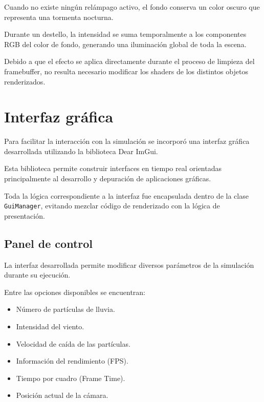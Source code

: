Cuando no existe ningún relámpago activo, el fondo conserva un color oscuro que representa una tormenta nocturna.

Durante un destello, la intensidad se suma temporalmente a los componentes RGB del color de fondo, generando una iluminación global de toda la escena.

Debido a que el efecto se aplica directamente durante el proceso de limpieza del framebuffer, no resulta necesario modificar los shaders de los distintos objetos renderizados.

\section{Interfaz gráfica}

Para facilitar la interacción con la simulación se incorporó una interfaz gráfica desarrollada utilizando la biblioteca Dear ImGui.

Esta biblioteca permite construir interfaces en tiempo real orientadas principalmente al desarrollo y depuración de aplicaciones gráficas.

Toda la lógica correspondiente a la interfaz fue encapsulada dentro de la clase \texttt{GuiManager}, evitando mezclar código de renderizado con la lógica de presentación.

\subsection{Panel de control}

La interfaz desarrollada permite modificar diversos parámetros de la simulación durante su ejecución.

Entre las opciones disponibles se encuentran:

\begin{itemize}

\item Número de partículas de lluvia.

\item Intensidad del viento.

\item Velocidad de caída de las partículas.

\item Información del rendimiento (FPS).

\item Tiempo por cuadro (Frame Time).

\item Posición actual de la cámara.

\end{itemize}


